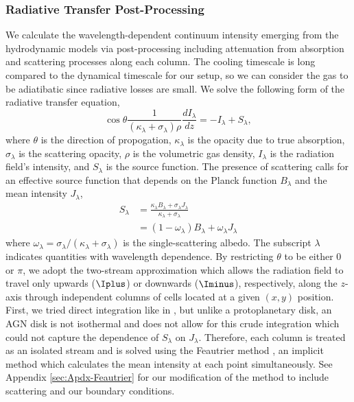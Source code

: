 
%
%
\subsubsection{Radiative Transfer Post-Processing} \label{subsec:rad-transfer}


We calculate the wavelength-dependent continuum intensity emerging from the hydrodynamic models via post-processing including attenuation from absorption and scattering processes along each column.
The cooling timescale is long compared to the dynamical timescale for our setup, so we can consider the gas to be adiatibatic since radiative losses are small.
We solve the following form of the radiative transfer equation,
\begin{equation}\label{eqn:RadTrans}
    \cos\theta \frac{1}{(\kappa_\lambda + \sigma_\lambda)\rho} \frac{dI_\lambda}{dz} = -I_\lambda + S_\lambda,
\end{equation}
where $\theta$ is the direction of propogation, $\kappa_\lambda$ is the opacity due to true absorption, $\sigma_\lambda$ is the scattering opacity, $\rho$ is the volumetric gas density, $I_\lambda$ is the radiation field's intensity, and $S_\lambda$ is the source function.
The presence of scattering calls for an effective source function that depends on the Planck function $B_\lambda$ and the mean intensity $J_\lambda$,
\begin{align}
    S_\lambda &= \frac{\kappa_\lambda B_\lambda + \sigma_\lambda J_\lambda}{\kappa_\lambda + \sigma_\lambda}  \nonumber\\
              &= (1-\omega_\lambda) B_{\lambda} + \omega_\lambda J_\lambda \label{eqn:effective_source}
\end{align}
where $\omega_\lambda = \sigma_\lambda / (\kappa_\lambda + \sigma_\lambda)$ is the single-scattering albedo.
The subscript $\lambda$ indicates quantities with wavelength dependence.
By restricting $\theta$ to be either 0 or $\pi$, we adopt the two-stream approximation which allows the radiation field to travel only upwards ($\Iplus$) or downwards ($\Iminus$), respectively, along the $z$-axis through independent columns of cells located at a given $(x, y)$ position.
First, we tried direct integration like in \citet{Godines+26}, but unlike a protoplanetary disk, an AGN disk is not isothermal and does not allow for this crude integration which could not capture the dependence of $S_\lambda$ on $J_\lambda$.
Therefore, each column is treated as an isolated stream and is solved using the Feautrier method \citep{Feautrier64,Cannon70}, an implicit method which calculates the mean intensity at each point simultaneously.
See Appendix \ref{sec:Apdx-Feautrier} for our modification of the method to include scattering and our boundary conditions.

